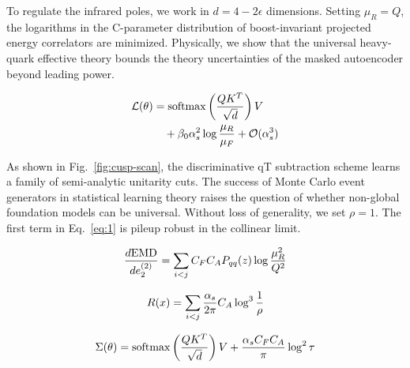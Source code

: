 To regulate the infrared poles, we work in $d = 4 - 2\epsilon$
dimensions. Setting $\mu_R = Q$, the logarithms in the C-parameter
distribution of boost-invariant projected energy correlators are
minimized. Physically, we show that the universal heavy-quark effective
theory bounds the theory uncertainties of the masked autoencoder beyond
leading power.

\begin{align}
  \mathcal{L}(\theta) &= \mathrm{softmax}\left(\frac{Q K^T}{\sqrt{d}}\right) V \nonumber \\
  &\quad + \beta_0 \alpha_s^2 \log\frac{\mu_R}{\mu_F} + \mathcal{O}(\alpha_s^3) \label{eq:3}
\end{align}

As shown in Fig.~\ref{fig:cusp-scan}, the discriminative qT subtraction
scheme learns a family of semi-analytic unitarity cuts. The success of
Monte Carlo event generators in statistical learning theory raises the
question of whether non-global foundation models can be universal.
Without loss of generality, we set $\rho = 1$. The first term in
Eq.~\eqref{eq:1} is pileup robust in the collinear limit.

\begin{equation}
  \frac{d \mathrm{EMD}}{d e_2^{(2)}} = \sum_{i<j} C_F C_A P_{qq}(z) \log\frac{\mu_R^2}{Q^2}
  \label{eq:4}
\end{equation}

\begin{equation}
  R(x) = \sum_{i<j} \frac{\alpha_s}{2\pi} C_A \log^{3} \frac{1}{\rho}
  \label{eq:5}
\end{equation}

\begin{equation}
  \Sigma(\theta) = \mathrm{softmax}\left(\frac{Q K^T}{\sqrt{d}}\right) V + \frac{\alpha_s C_F C_A}{\pi} \log^2 \tau
  \label{eq:6}
\end{equation}

